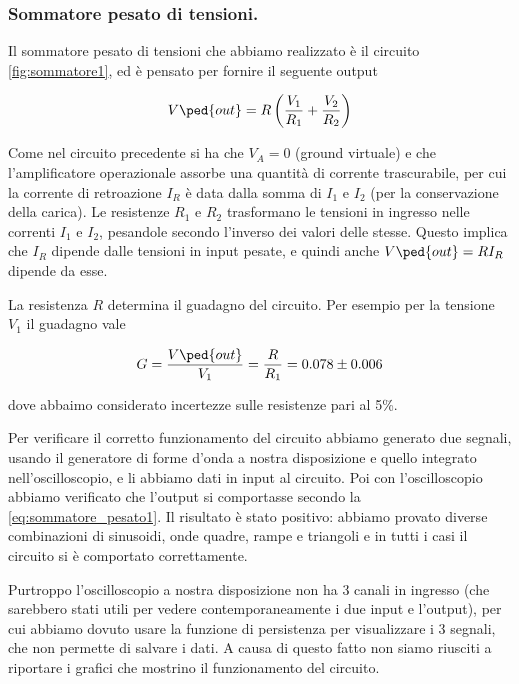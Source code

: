 \subsubsection{Sommatore pesato di tensioni.}

Il sommatore pesato di tensioni che abbiamo realizzato è il circuito \ref{fig:sommatore1},
ed è pensato per fornire il seguente output

\begin{equation}
    V\ped{out} = R\left(\frac{V_1}{R_1} + \frac{V_2}{R_2}\right)
    \label{eq:sommatore_pesato1}
\end{equation}

Come nel circuito precedente si ha che $V_A = 0$ (ground virtuale) e che
l'amplificatore operazionale assorbe una quantità di corrente trascurabile,
per cui la corrente di retroazione $I_R$ è data dalla somma di $I_1$ e $I_2$
(per la conservazione della carica).
Le resistenze $R_1$ e $R_2$ trasformano le tensioni in ingresso nelle correnti
$I_1$ e $I_2$, pesandole secondo l'inverso dei valori delle stesse.
Questo implica che $I_R$ dipende dalle tensioni in input pesate,
e quindi anche $V\ped{out} = RI_R$ dipende da esse.

La resistenza $R$ determina il guadagno del circuito. Per esempio per la tensione
$V_1$ il guadagno vale

\begin{equation}
    G = \frac{V\ped{out}}{V_1} = \frac{R}{R_1} = 0.078 \pm 0.006
\end{equation}

dove abbaimo considerato incertezze sulle resistenze pari al 5\%.

Per verificare il corretto funzionamento del circuito abbiamo generato due segnali,
usando il generatore di forme d'onda a nostra disposizione e quello integrato
nell'oscilloscopio, e li abbiamo dati in input al circuito. Poi con l'oscilloscopio
abbiamo verificato che l'output si comportasse secondo la \eqref{eq:sommatore_pesato1}.
Il risultato è stato positivo: abbiamo provato diverse combinazioni di sinusoidi,
onde quadre, rampe e triangoli e in tutti i casi il circuito si è comportato correttamente.

Purtroppo l'oscilloscopio a nostra disposizione non ha 3 canali in ingresso (che sarebbero
stati utili per vedere contemporaneamente i due input e l'output), per cui abbiamo dovuto
usare la funzione di persistenza per visualizzare i 3 segnali, che non permette di salvare i dati.
A causa di questo fatto non siamo riusciti a riportare i grafici che mostrino il funzionamento
del circuito.
